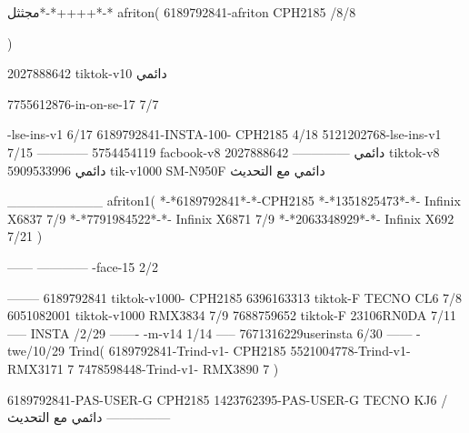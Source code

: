 مجثثل*-*++++*-*
afriton(
6189792841-afriton CPH2185  /8/8

)

2027888642 tiktok-v10
دائمي

7755612876-in-on-se-17 7/7

-lse-ins-v1 6/17
6189792841-INSTA-100- CPH2185 4/18
5121202768-lse-ins-v1 7/15
------------
5754454119 facbook-v8
دائمي
--------------
2027888642 tiktok-v8
دائمي
5909533996 tik-v1000  SM-N950F
دائمي مع التحديث

__________
afriton1(
*-*6189792841*-*-CPH2185
*-*1351825473*-*-  Infinix X6837  7/9
*-*7791984522*-*-  Infinix X6871  7/9
*-*2063348929*-*-  Infinix X692  7/21
)


------
------------
-face-15 2/2

--------
6189792841 tiktok-v1000- CPH2185 
6396163313 tiktok-F TECNO CL6  7/8
6051082001 tiktok-v1000 RMX3834  7/9
7688759652 tiktok-F 23106RN0DA  7/11
-----
 INSTA /2/29
-------
-m-v14 1/14
-----
7671316229userinsta 6/30
------
-twe/10/29
Trind(
6189792841-Trind-v1- CPH2185 
5521004778-Trind-v1- RMX3171 7
7478598448-Trind-v1- RMX3890 7
)


6189792841-PAS-USER-G CPH2185 
1423762395-PAS-USER-G TECNO KJ6  /دائمي مع التحديث
    ---------------
